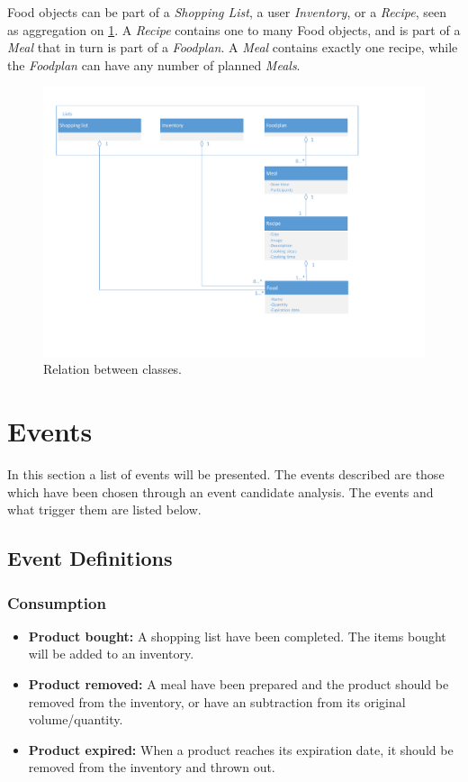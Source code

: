 Food objects can be part of a \textit{Shopping List}, a user \textit{Inventory}, or a \textit{Recipe}, seen as aggregation on \cref{fig:classDiagram}. A \textit{Recipe} contains one to many Food objects, and is part of a \textit{Meal} that in turn is part of a \textit{Foodplan}. A \textit{Meal} contains exactly one recipe, while the \textit{Foodplan} can have any number of planned \textit{Meals}.

\begin{figure}[H]
	\centering
	\includegraphics[clip=true, width=1\textwidth, trim=1cm 3cm 4cm 0]{Development/Klasseting}
	\caption{Relation between classes.}
	\label{fig:classDiagram}
\end{figure}

\section{Events}
In this section a list of events will be presented. The events described are those which have been chosen through an event candidate analysis. The events and what trigger them are listed below.

\subsection{Event Definitions}

\subsubsection{Consumption}
\begin{itemize}
\item \textbf{Product bought:} A shopping list have been completed. The items bought will be added to an inventory.
\item \textbf{Product removed:} A meal have been prepared and the product should be removed from the inventory, or have an subtraction from its original volume/quantity.
\item \textbf{Product expired:} When a product reaches its expiration date, it should be removed from the inventory and thrown out.
\end{itemize}

